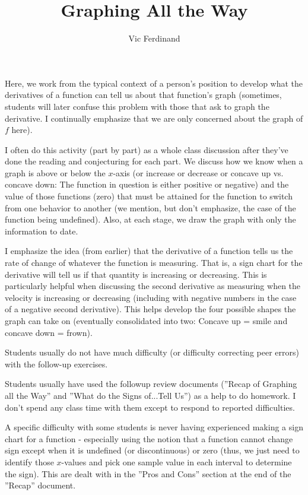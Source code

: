 \documentclass{ximera}
\author{Vic Ferdinand}
\title{Graphing All the Way}
\begin{document}
\begin{abstract}
\end{abstract}
\maketitle

\begin{instructorIntro}
Here, we work from the typical context of a person's position to develop what the derivatives of a function can tell us about that function's graph (sometimes, students will later confuse this problem with those that ask to graph the derivative.  I continually emphasize that we are only concerned about the graph of $f$ here).

I often do this activity (part by part) as a whole class discussion after they've done the reading and conjecturing for each part.  We discuss how we know when a graph is above or below the $x$-axis (or increase or decrease or concave up vs. concave down:  The function in question is either positive or negative) and the value of those functions (zero) that must be attained for the function to switch from one behavior to another (we mention, but don't emphasize, the case of the function being undefined).  Also, at each stage, we draw the graph with only the information to date.

I emphasize the idea (from earlier) that the derivative of a function tells us the rate of change of whatever the function is measuring.  That is, a sign chart for the derivative will tell us if that quantity is increasing or decreasing.  This is particularly helpful when discussing the second derivative as measuring when the velocity is increasing or decreasing (including with negative numbers in the case of a negative second derivative).  This helps develop the four possible shapes the graph can take on (eventually consolidated into two:  Concave up = smile and concave down = frown).

Students usually do not have much difficulty (or difficulty correcting peer errors) with the follow-up exercises.

Students usually have used the followup review documents (''Recap of Graphing all the Way'' and ''What do the Signs of...Tell Us'') as a help to do homework.  I don't spend any class time with them except to respond to reported difficulties.  

A specific difficulty with some students is never having experienced making a sign chart for a function - especially using the notion that a function cannot change sign except when it is undefined (or discontinuous) or zero (thus, we just need to identify those $x$-values and pick one sample value in each interval to determine the sign).  This are dealt with in the ''Pros and Cons'' section at the end of the ''Recap'' document.

\end{instructorIntro}
\end{document}

